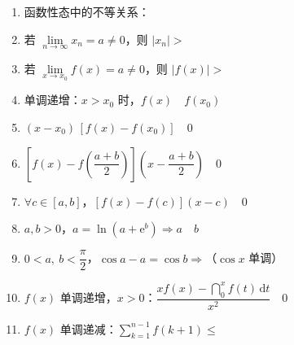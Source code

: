 \documentclass[a4paper,12pt]{article}
\begin{document}
    \vspace{1em}

    \begin{minipage}[t]{0.30\textwidth}
        \begin{enumerate}[leftmargin=*, itemsep=1.1em]
            \item 函数性态中的不等关系：
            \item 若 $\lim\limits_{n\to\infty} x_n = a \ne 0$，则 $|x_n| >$
            \item 若 $\lim\limits_{x\to x_0} f(x) = a \ne 0$，则 $|f(x)| >$
            \item 单调递增：$x>x_0$ 时，$f(x) \quad f(x_0)$
        \end{enumerate}
    \end{minipage}
    \hfill
    \begin{minipage}[t]{0.30\textwidth}
        \begin{enumerate}[leftmargin=*, itemsep=1.1em]
            \setcounter{enumi}{4}
            \item $(x-x_0)\,[f(x)-f(x_0)] \quad 0$
            \item $\left[f(x)-f\!\left(\dfrac{a+b}{2}\right)\right]\left(x-\dfrac{a+b}{2}\right) \quad 0$
            \item $\forall c \in [a,b]$，$[f(x)-f(c)](x-c) \quad 0$
            \item $a,b>0$，$a=\ln(a+\mathrm{e}^b) \Rightarrow a \quad b$
        \end{enumerate}
    \end{minipage}
    \hfill
    \begin{minipage}[t]{0.30\textwidth}
        \begin{enumerate}[leftmargin=*, itemsep=1.1em]
            \setcounter{enumi}{8}
            \item $0<a,\ b<\dfrac{\pi}{2}$，$\cos a - a = \cos b \Rightarrow$（$\cos x$ 单调）
            \item $f(x)$ 单调递增，$x>0$：$\dfrac{xf(x)-\dint_0^x f(t)\,\mathrm{d}t}{x^2} \quad 0$
            \item $f(x)$ 单调递减：$\sum\limits_{k=1}^{n-1} f(k+1) \le$
        \end{enumerate}
    \end{minipage}
    \hfill

    \newpage
\end{document}
